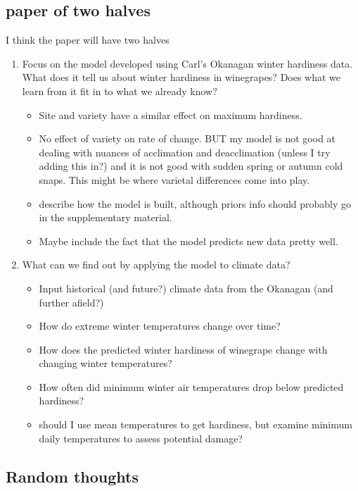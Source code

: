 \documentclass[11pt,letter]{article}
\begin{document}
\subsection{paper of two halves}

I think the paper will have two halves
\begin{enumerate}
  \item Focus on the model developed using Carl's Okanagan winter hardiness data. What does it tell us about winter hardiness in winegrapes? Does what we learn from it fit in to what we already know? 
  \begin{itemize}
    \item Site and variety have a similar effect on maximum hardiness. 
    \item No effect of variety on rate of change. BUT my model is not good at dealing with nuances of acclimation and deacclimation (unless I try adding this in?) and it is not good with sudden spring or autumn cold snaps. This might be where varietal differences come into play.   
      \item describe how the model is built, although priors info should probably go in the supplementary material.
  \item Maybe include the fact that the model predicts new data pretty well.  
  \end{itemize}
  \item What can we find out by applying the model to climate data?
  \begin{itemize}
    \item Input historical (and future?) climate data from the Okanagan (and further afield?) 
    \item How do extreme winter temperatures change over time?
    \item How does the predicted winter hardiness of winegrape change with changing winter temperatures?
    \item How often did minimum winter air temperatures drop below predicted hardiness?
    \item should I use mean temperatures to get hardiness, but examine minimum daily temperatures to assess potential damage?   
  \end{itemize}
\end{enumerate}

\subsection{Random thoughts}
\end{document}
